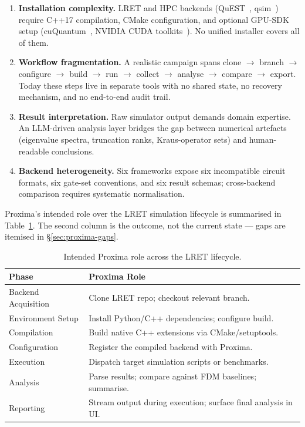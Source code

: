 \documentclass[11pt,a4paper]{article}
\begin{document}
\begin{enumerate}[leftmargin=1.5cm]
  \item \textbf{Installation complexity.} LRET and HPC backends
        (QuEST~\cite{jones2019quest}, qsim~\cite{qsim}) require C++17 compilation,
        CMake configuration, and optional GPU-SDK setup
        (cuQuantum~\cite{bayraktar2023cuquantum}, NVIDIA CUDA
        toolkits~\cite{nickolls2008cuda}). No unified installer covers all of
        them.
  \item \textbf{Workflow fragmentation.} A realistic campaign spans clone $\to$
        branch $\to$ configure $\to$ build $\to$ run $\to$ collect $\to$
        analyse $\to$ compare $\to$ export. Today these steps live in separate
        tools with no shared state, no recovery mechanism, and no end-to-end
        audit trail.
  \item \textbf{Result interpretation.} Raw simulator output demands domain
        expertise. An LLM-driven analysis layer bridges the gap between numerical
        artefacts (eigenvalue spectra, truncation ranks, Kraus-operator sets) and
        human-readable conclusions.
  \item \textbf{Backend heterogeneity.} Six frameworks expose six incompatible
        circuit formats, six gate-set conventions, and six result schemas;
        cross-backend comparison requires systematic normalisation.
\end{enumerate}

Proxima's intended role over the LRET simulation lifecycle is summarised in
Table~\ref{tab:proxima-lifecycle}. The second column is the outcome, not the
current state --- gaps are itemised in \S\ref{sec:proxima-gaps}.

\begin{table}[!h]
\centering
\small
\renewcommand{\arraystretch}{1.2}
\caption{Intended Proxima role across the LRET lifecycle.}
\label{tab:proxima-lifecycle}
\begin{tabular}{@{}ll@{}}
\toprule
\textbf{Phase} & \textbf{Proxima Role} \\
\midrule
Backend Acquisition & Clone LRET repo; checkout relevant branch. \\
Environment Setup   & Install Python/C++ dependencies; configure build. \\
Compilation         & Build native C++ extensions via CMake/setuptools. \\
Configuration       & Register the compiled backend with Proxima. \\
Execution           & Dispatch target simulation scripts or benchmarks. \\
Analysis            & Parse results; compare against FDM baselines; summarise. \\
Reporting           & Stream output during execution; surface final analysis in UI. \\
\bottomrule
\end{tabular}
\end{table}
\end{document}
